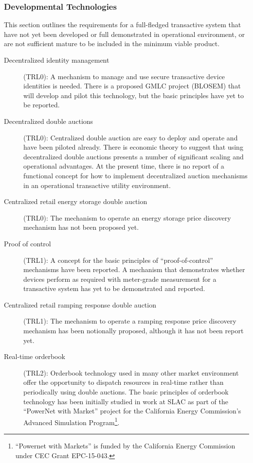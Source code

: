 \subsubsection{Developmental Technologies}

This section outlines the requirements for a full-fledged transactive system that have not yet been developed or full demonstrated in operational environment, or are not sufficient mature to be included in the minimum viable product.

\begin{description}

    \item[Decentralized identity management] (TRL0): A mechanism to manage and use secure transactive device identities is needed.  There is a proposed GMLC project (BLOSEM) that will develop and pilot this technology, but the basic principles have yet to be reported.

    \item[Decentralized double auctions] (TRL0): Centralized double auction are easy to deploy and operate and have been piloted already. There is economic theory to suggest that using decentralized double auctions presents a number of significant scaling and operational advantages. At the present time, there is no report of a functional concept for how to implement decentralized auction mechanisms in an operational transactive utility environment.

    \item[Centralized retail energy storage double auction] (TRL0): The mechanism to operate an energy storage price discovery mechanism has not been proposed yet.

    \item[Proof of control] (TRL1): A concept for the basic principles of ``proof-of-control'' mechanisms have been reported.  A mechanism that demonstrates whether devices perform as required with meter-grade measurement for a transactive system has yet to be demonstrated and reported. 
    
    \item[Centralized retail ramping response double auction] (TRL1): The mechanism to operate a ramping response price discovery mechanism has been notionally proposed, although it has not been report yet.

    \item[Real-time orderbook] (TRL2): Orderbook technology used in many other market environment offer the opportunity to dispatch resources in real-time rather than periodically using double auctions.  The basic principles of orderbook technology has been initially studied in work at SLAC as part of the ``PowerNet with Market'' project for the California Energy Commission's Advanced Simulation Program\footnote{``Powernet with Markets'' is funded by the California Energy Commission under CEC Grant EPC-15-043.}.


\end{description}
